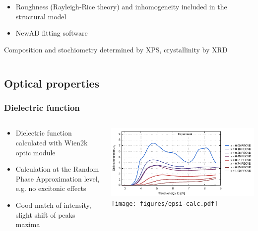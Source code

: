 \documentclass[noamsthm,8pt,t,xcolor={dvipsnames}]{beamer}
\begin{document}
\begin{frame}
\begin{columns}
\begin{column}{0.5\textwidth}
{\begin{itemize}
               \item Roughness (Rayleigh-Rice theory) and inhomogeneity included in the structural model
               \item NewAD fitting software
            \end{itemize}
            Composition and stochiometry determined by XPS, crystallinity by XRD
         }
         \end{column}
   \end{columns}
\end{frame}

\subsection{Optical properties}

\begin{frame}
   \frametitle{Dielectric function}

   \begin{columns}
      \begin{column}{0.3\textwidth}
         \begin{itemize}
            \item Dielectric function calculated with Wien2k optic module 
            \item Calculation at the Random Phase Approximation level, e.g. no excitonic effects
            \item Good match of intensity, slight shift of peaks maxima
         \end{itemize}
      \end{column}
      \begin{column}{0.7\textwidth}
         \begin{center}
            \includegraphics[width=\linewidth]{figures/epsi.pdf}
            \newline
            \texttt{[image: figures/epsi-calc.pdf]}
         \end{center}
      \end{column}
   \end{columns}
\end{frame}
\end{document}
